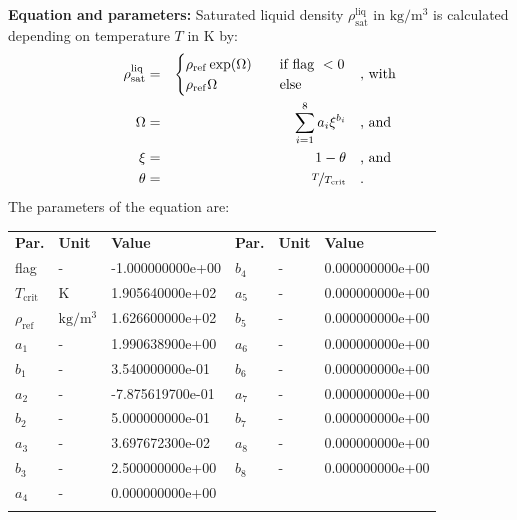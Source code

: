 \textbf{Equation and parameters:}
\newline
%
Saturated liquid density $\rho_\mathrm{sat}^\mathrm{liq}$ in $\si{\kilogram\per\cubic\meter}$ is calculated depending on temperature $T$ in $\si{\kelvin}$ by:
%
\begin{equation*}
\begin{split}
\rho_\mathrm{sat}^\mathrm{liq} &=& \begin{cases} \rho_\mathrm{ref} \exp(\Omega) & \quad \text{if flag } < 0 \\ \rho_\mathrm{ref} \Omega & \quad \text{else} \end{cases} & \quad\text{, with} \\
\Omega &=& \sum_{i=1}^{8} a_i \xi^{b_i} & \quad\text{, and} \\
\xi &=& 1 - \theta & \quad\text{, and} \\
\theta &=& \nicefrac{T}{T_\mathrm{crit}} & \quad\text{.}
\end{split}
\end{equation*}
%
The parameters of the equation are:
%
\begin{longtable}[l]{lll|lll}
\toprule
\addlinespace
\textbf{Par.} & \textbf{Unit} & \textbf{Value} &	\textbf{Par.} & \textbf{Unit} & \textbf{Value} \\
\addlinespace
\midrule
\endhead

\bottomrule
\endfoot
\bottomrule
\endlastfoot
\addlinespace

flag & - & -1.000000000e+00 & $b_4$ & - & 0.000000000e+00 \\
$T_\mathrm{crit}$ & $\si{\kelvin}$ & 1.905640000e+02 & $a_5$ & - & 0.000000000e+00 \\
$\rho_\mathrm{ref}$ & $\si{\kilogram\per\cubic\meter}$ & 1.626600000e+02 & $b_5$ & - & 0.000000000e+00 \\
$a_1$ & - & 1.990638900e+00 & $a_6$ & - & 0.000000000e+00 \\
$b_1$ & - & 3.540000000e-01 & $b_6$ & - & 0.000000000e+00 \\
$a_2$ & - & -7.875619700e-01 & $a_7$ & - & 0.000000000e+00 \\
$b_2$ & - & 5.000000000e-01 & $b_7$ & - & 0.000000000e+00 \\
$a_3$ & - & 3.697672300e-02 & $a_8$ & - & 0.000000000e+00 \\
$b_3$ & - & 2.500000000e+00 & $b_8$ & - & 0.000000000e+00 \\
$a_4$ & - & 0.000000000e+00 & & & \\

\addlinespace\end{longtable}

